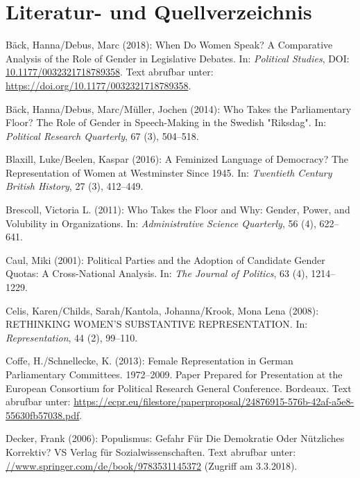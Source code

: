 \documentclass[12pt,ngerman,]{article}
\begin{document}
\pagebreak
\section{Literatur- und Quellverzeichnis}
\setlength{\parindent}{-0.2in}
\setlength{\leftskip}{0.2in}
\setlength{\parskip}{8pt}
\vspace*{-0.2in}

\noindent

\hypertarget{refs}{}
\leavevmode\hypertarget{ref-back_2018}{}%
Bäck, Hanna/Debus, Marc (2018): When Do Women Speak? A Comparative
Analysis of the Role of Gender in Legislative Debates. In:
\emph{Political Studies}, DOI:
\href{https://doi.org/10.1177/0032321718789358}{10.1177/0032321718789358}.
Text abrufbar unter: \url{https://doi.org/10.1177/0032321718789358}.

\leavevmode\hypertarget{ref-back_2014}{}%
Bäck, Hanna/Debus, Marc/Müller, Jochen (2014): Who Takes the
Parliamentary Floor? The Role of Gender in Speech-Making in the Swedish
"Riksdag". In: \emph{Political Research Quarterly}, 67 (3), 504--518.

\leavevmode\hypertarget{ref-blaxill_2016}{}%
Blaxill, Luke/Beelen, Kaspar (2016): A Feminized Language of Democracy?
The Representation of Women at Westminster Since 1945. In:
\emph{Twentieth Century British History}, 27 (3), 412--449.

\leavevmode\hypertarget{ref-brescoll_2011}{}%
Brescoll, Victoria L. (2011): Who Takes the Floor and Why: Gender,
Power, and Volubility in Organizations. In: \emph{Administrative Science
Quarterly}, 56 (4), 622--641.

\leavevmode\hypertarget{ref-caul_2001}{}%
Caul, Miki (2001): Political Parties and the Adoption of Candidate
Gender Quotas: A Cross-National Analysis. In: \emph{The Journal of
Politics}, 63 (4), 1214--1229.

\leavevmode\hypertarget{ref-celis_2008}{}%
Celis, Karen/Childs, Sarah/Kantola, Johanna/Krook, Mona Lena (2008):
RETHINKING WOMEN'S SUBSTANTIVE REPRESENTATION. In:
\emph{Representation}, 44 (2), 99--110.

\leavevmode\hypertarget{ref-coffe_2013}{}%
Coffe, H./Schnellecke, K. (2013): Female Representation in German
Parliamentary Committees. 1972--2009. Paper Prepared for Presentation at
the European Consortium for Political Research General Conference.
Bordeaux. Text abrufbar unter:
\url{https://ecpr.eu/filestore/paperproposal/24876915-576b-42af-a5e8-55630fb57038.pdf}.

\leavevmode\hypertarget{ref-decker_populismus_2006}{}%
Decker, Frank (2006): Populismus: Gefahr Für Die Demokratie Oder
Nützliches Korrektiv? VS Verlag für Sozialwissenschaften. Text abrufbar
unter: \url{//www.springer.com/de/book/9783531145372} (Zugriff am
3.3.2018).
\end{document}
